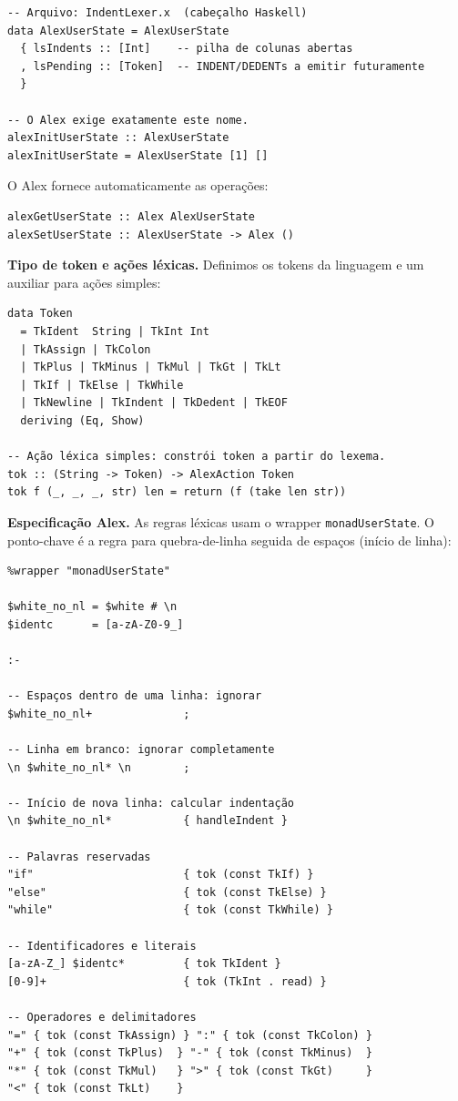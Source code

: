 \begin{verbatim}
-- Arquivo: IndentLexer.x  (cabeçalho Haskell)
data AlexUserState = AlexUserState
  { lsIndents :: [Int]    -- pilha de colunas abertas
  , lsPending :: [Token]  -- INDENT/DEDENTs a emitir futuramente
  }

-- O Alex exige exatamente este nome.
alexInitUserState :: AlexUserState
alexInitUserState = AlexUserState [1] []
\end{verbatim}

O Alex fornece automaticamente as operações:

\begin{verbatim}
alexGetUserState :: Alex AlexUserState
alexSetUserState :: AlexUserState -> Alex ()
\end{verbatim}

\textbf{Tipo de token e ações léxicas.} Definimos os tokens da
linguagem e um auxiliar  para ações simples:

\begin{verbatim}
data Token
  = TkIdent  String | TkInt Int
  | TkAssign | TkColon
  | TkPlus | TkMinus | TkMul | TkGt | TkLt
  | TkIf | TkElse | TkWhile
  | TkNewline | TkIndent | TkDedent | TkEOF
  deriving (Eq, Show)

-- Ação léxica simples: constrói token a partir do lexema.
tok :: (String -> Token) -> AlexAction Token
tok f (_, _, _, str) len = return (f (take len str))
\end{verbatim}

\textbf{Especificação Alex.} As regras léxicas usam o wrapper
\texttt{monadUserState}. O ponto-chave é a regra para
quebra-de-linha seguida de espaços (início de linha):

\begin{verbatim}
%wrapper "monadUserState"

$white_no_nl = $white # \n
$identc      = [a-zA-Z0-9_]

:-

-- Espaços dentro de uma linha: ignorar
$white_no_nl+              ;

-- Linha em branco: ignorar completamente
\n $white_no_nl* \n        ;

-- Início de nova linha: calcular indentação
\n $white_no_nl*           { handleIndent }

-- Palavras reservadas
"if"                       { tok (const TkIf) }
"else"                     { tok (const TkElse) }
"while"                    { tok (const TkWhile) }

-- Identificadores e literais
[a-zA-Z_] $identc*         { tok TkIdent }
[0-9]+                     { tok (TkInt . read) }

-- Operadores e delimitadores
"=" { tok (const TkAssign) } ":" { tok (const TkColon) }
"+" { tok (const TkPlus)  } "-" { tok (const TkMinus)  }
"*" { tok (const TkMul)   } ">" { tok (const TkGt)     }
"<" { tok (const TkLt)    }
\end{verbatim}

